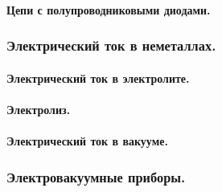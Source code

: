 \documentclass{article}
\begin{document}
            \paragraph{Цепи с полупроводниковыми диодами.}
        \subsubsection{Электрический ток в неметаллах.}
            \paragraph{Электрический ток в электролите.}
            \paragraph{Электролиз.}
            \paragraph{Электрический ток в вакууме.}
        \subsubsection{Электровакуумные приборы.}
    
\end{document}

